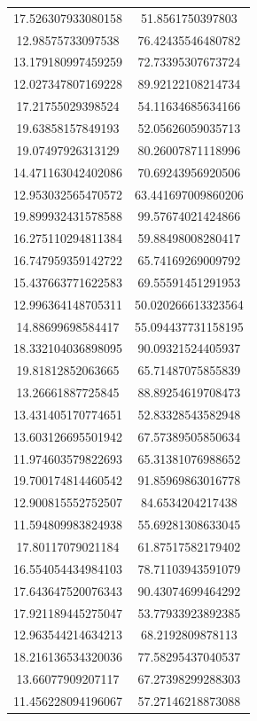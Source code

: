 \begin{table}
\begin{tabular}{cc}
17.526307933080158 & 51.8561750397803 \\
12.98575733097538 & 76.42435546480782 \\
13.179180997459259 & 72.73395307673724 \\
12.027347807169228 & 89.92122108214734 \\
17.21755029398524 & 54.11634685634166 \\
19.63858157849193 & 52.05626059035713 \\
19.07497926313129 & 80.26007871118996 \\
14.471163042402086 & 70.69243956920506 \\
12.953032565470572 & 63.441697009860206 \\
19.899932431578588 & 99.57674021424866 \\
16.275110294811384 & 59.88498008280417 \\
16.747959359142722 & 65.74169269009792 \\
15.437663771622583 & 69.55591451291953 \\
12.996364148705311 & 50.020266613323564 \\
14.88699698584417 & 55.094437731158195 \\
18.332104036898095 & 90.09321524405937 \\
19.81812852063665 & 65.71487075855839 \\
13.26661887725845 & 88.89254619708473 \\
13.431405170774651 & 52.83328543582948 \\
13.603126695501942 & 67.57389505850634 \\
11.974603579822693 & 65.31381076988652 \\
19.700174814460542 & 91.85969863016778 \\
12.900815552752507 & 84.6534204217438 \\
11.594809983824938 & 55.69281308633045 \\
17.80117079021184 & 61.87517582179402 \\
16.554054434984103 & 78.71103943591079 \\
17.643647520076343 & 90.43074699464292 \\
17.921189445275047 & 53.77933923892385 \\
12.963544214634213 & 68.2192809878113 \\
18.216136534320036 & 77.58295437040537 \\
13.66077909207117 & 67.27398299288303 \\
11.456228094196067 & 57.27146218873088 \\

\end{tabular}
\end{table}
